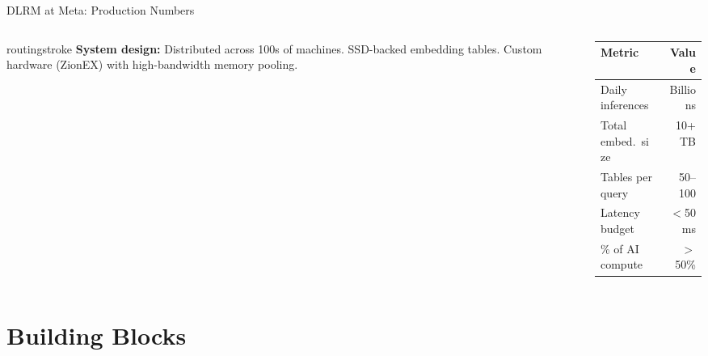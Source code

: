 \documentclass[aspectratio=169, 12pt]{beamer}
\begin{document}
\begin{frame}{DLRM at Meta: Production Numbers}
\begin{columns}[T]
\begin{column}{0.55\textwidth}
    \vspace{0.1cm}
    \begin{mlsyscard}{routingstroke}
    {\scriptsize \textbf{System design:} Distributed across 100s of machines. SSD-backed embedding tables. Custom hardware (ZionEX) with high-bandwidth memory pooling.}
    \end{mlsyscard}
  \end{column}
  \begin{column}{0.42\textwidth}
    \renewcommand{\arraystretch}{1.05}
    {\scriptsize
    \begin{tabular}{@{}lr@{}}
      \toprule
      \textbf{Metric} & \textbf{Value} \\
      \midrule
      Daily inferences & Billions \\
      Total embed.\ size & 10+ TB \\
      Tables per query & 50--100 \\
      Latency budget & $<$50 ms \\
      \% of AI compute & $>$50\% \\
      \bottomrule
    \end{tabular}
    }

    \vspace{0.1cm}
  \end{column}
\end{columns}

\end{frame}

\section{Building Blocks}
\end{document}
